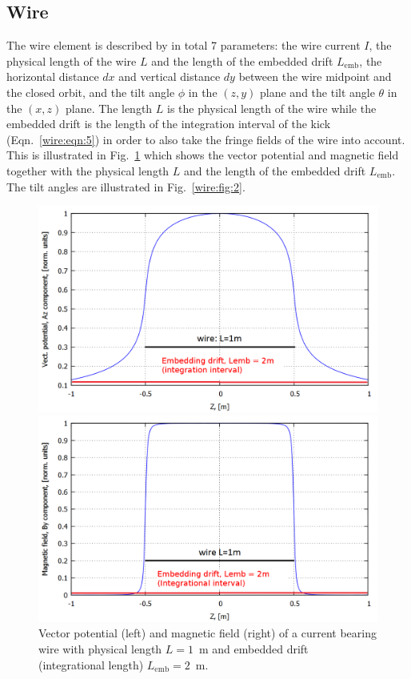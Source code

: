 \documentclass[english]{article}
\begin{document}
\subsection{Wire}
\label{sec:wire}
The wire element is described by in total 7 parameters: the wire current $I$, the physical length of the wire $L$ and the length of the embedded drift $L_{\mathrm{emb}}$, the horizontal distance $dx$ and vertical distance $dy$ between the wire midpoint and the closed orbit, and the tilt angle $\phi$ in the $(z,y)$ plane and the tilt angle $\theta$ in the $(x,z)$ plane. The length $L$ is the physical length of the wire while the embedded drift is the length of the integration interval of the kick (Eqn.~\ref{wire:eqn:5}) in order to also take the fringe fields of the wire into account. This is illustrated in Fig.~\ref{wire:fig:1} which shows the vector potential and magnetic field together with the physical length $L$ and the length of the embedded drift $L_{\mathrm{emb}}$. The tilt angles are illustrated in Fig.~\ref{wire:fig:2}.
\begin{figure}[t]
	\begin{minipage}{0.5\linewidth}
			\centering
			\includegraphics[width=1\linewidth]{wire_vector_potential.png}
	\end{minipage}
	\begin{minipage}{0.5\linewidth}
		\centering
		\includegraphics[width=1\linewidth]{wire_field.png}
	\end{minipage}
	\caption{Vector potential (left) and magnetic field (right) of a current bearing wire with physical length $L=1$~m and embedded drift (integrational length) $L_{\mathrm{emb}}=2$~m.\label{wire:fig:1}}
\end{figure}
\end{document}
